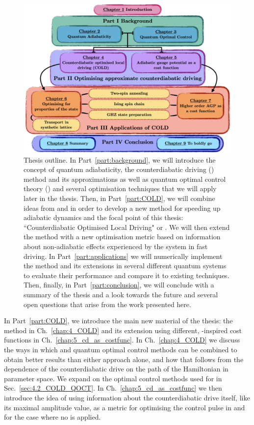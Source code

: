 \begin{figure}[t!]
    \centering
    \includegraphics[width=\linewidth]{images_v1/thesis_overview.png} \caption[Thesis outline.]{Thesis outline. In Part~\ref{part:background}, we will introduce the concept of quantum adiabaticity, the counterdiabatic driving () method and its approximations as well as quantum optimal control theory () and several optimisation techniques that we will apply later in the thesis. Then, in Part~\ref{part:COLD}, we will combine ideas from  and  in order to develop a new method for speeding up adiabatic dynamics and the focal point of this thesis: ``Counterdiabatic Optimised Local Driving" or . We will then extend the method with a new optimisation metric based on information about non-adiabatic effects experienced by the system in fast driving. In Part~\ref{part:applications} we will numerically implement the  method and its extensions in several different quantum systems to evaluate their performance and compare it to existing techniques. Then, finally, in Part~\ref{part:conclusion}, we will conclude with a summary of the thesis and a look towards the future and several open questions that arise from the work presented here.}\label{fig:thesis_overview}
\end{figure}

In Part~\ref{part:COLD}, we introduce the main new material of the thesis: the  method in Ch.~\ref{chap:4_COLD} and its extension using different, -inspired cost functions in Ch.~\ref{chap:5_cd_as_costfunc}. In Ch.~\ref{chap:4_COLD} we discuss the ways in which  and quantum optimal control methods can be combined to obtain better results than either approach alone, and how that follows from the dependence of the counterdiabatic drive on the path of the Hamiltonian in parameter space. We expand on the optimal control methods used for  in Sec.~\ref{sec:4.2_COLD_QOCT}. In Ch.~\ref{chap:5_cd_as_costfunc} we then introduce the idea of using information about the counterdiabatic drive itself, like its maximal amplitude value, as a metric for optimising the control pulse in  and for the case where no  is applied.

